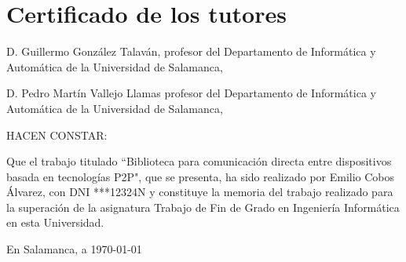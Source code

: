 \section*{Certificado de los tutores}

\vspace{2em}

D. Guillermo González Talaván, profesor del Departamento de Informática y
Automática de la Universidad de Salamanca,

D. Pedro Martín Vallejo Llamas profesor del Departamento de Informática y
Automática de la Universidad de Salamanca,

\vspace{2em}

\noindent HACEN CONSTAR:

\vspace{2em}

Que el trabajo titulado ``Biblioteca para comunicación directa entre
dispositivos basada en tecnologías P2P", que se presenta, ha sido realizado por
Emilio Cobos Álvarez, con DNI ***12324N y constituye la memoria del trabajo
realizado para la superación de la asignatura Trabajo de Fin de Grado en
Ingeniería Informática en esta Universidad.

\vspace{2em}

\begin{center}
En Salamanca, a \today
\end{center}
